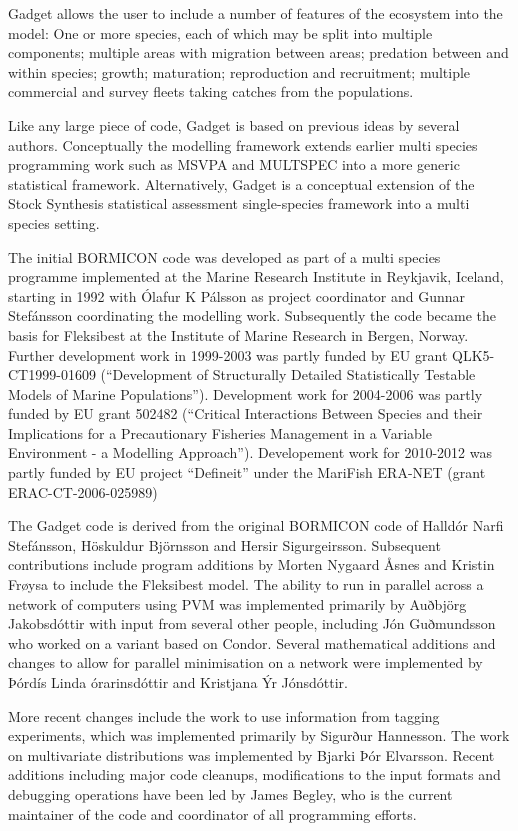 \documentclass[]{book}
\begin{document}
Gadget allows the user to include a number of features of the ecosystem
into the model: One or more species, each of which may be split into
multiple components; multiple areas with migration between areas;
predation between and within species; growth; maturation; reproduction
and recruitment; multiple commercial and survey fleets taking catches
from the populations.

Like any large piece of code, Gadget is based on previous ideas by
several authors. Conceptually the modelling framework extends earlier
multi species programming work such as MSVPA and MULTSPEC into a more
generic statistical framework. Alternatively, Gadget is a conceptual
extension of the Stock Synthesis statistical assessment single-species
framework into a multi species setting.

The initial BORMICON code was developed as part of a multi species
programme implemented at the Marine Research Institute in Reykjavik,
Iceland, starting in 1992 with Ólafur K Pálsson as project coordinator
and Gunnar Stefánsson coordinating the modelling work. Subsequently the
code became the basis for Fleksibest at the Institute of Marine Research
in Bergen, Norway. Further development work in 1999-2003 was partly
funded by EU grant QLK5-CT1999-01609 (``Development of Structurally
Detailed Statistically Testable Models of Marine Populations'').
Development work for 2004-2006 was partly funded by EU grant 502482
(``Critical Interactions Between Species and their Implications for a
Precautionary Fisheries Management in a Variable Environment - a
Modelling Approach''). Developement work for 2010-2012 was partly funded
by EU project ``Defineit'' under the MariFish ERA-NET (grant
ERAC-CT-2006-025989)

The Gadget code is derived from the original BORMICON code of Halldór
Narfi Stefánsson, Höskuldur Björnsson and Hersir Sigurgeirsson.
Subsequent contributions include program additions by Morten Nygaard
Åsnes and Kristin Frøysa to include the Fleksibest model. The ability to
run in parallel across a network of computers using PVM was implemented
primarily by Auðbjörg Jakobsdóttir with input from several other people,
including Jón Guðmundsson who worked on a variant based on Condor.
Several mathematical additions and changes to allow for parallel
minimisation on a network were implemented by Þórdís Linda órarinsdóttir
and Kristjana Ýr Jónsdóttir.

More recent changes include the work to use information from tagging
experiments, which was implemented primarily by Sigurður Hannesson. The
work on multivariate distributions was implemented by Bjarki Þór
Elvarsson. Recent additions including major code cleanups, modifications
to the input formats and debugging operations have been led by James
Begley, who is the current maintainer of the code and coordinator of all
programming efforts.
\end{document}
